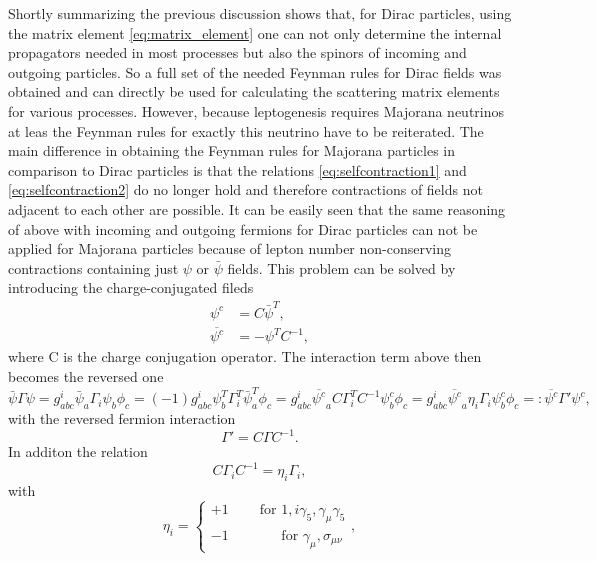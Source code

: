 Shortly summarizing the previous discussion shows that, for Dirac particles, using the matrix element \eqref{eq:matrix_element} one can not only determine the internal propagators needed in most processes but also the spinors of incoming and outgoing particles. So a full set of the needed Feynman rules for Dirac fields was obtained and can directly be used for calculating the scattering matrix elements for various processes. \newline\indent
However, because leptogenesis requires Majorana neutrinos at leas the Feynman rules for exactly this neutrino have to be reiterated. The main difference in obtaining the Feynman rules for Majorana particles in comparison to Dirac particles is that the relations \eqref{eq:selfcontraction1} and \eqref{eq:selfcontraction2} do no longer hold and therefore contractions of fields not adjacent to each other are possible. It can be easily seen that the same reasoning of above with incoming and outgoing fermions for Dirac particles can not be applied for Majorana particles because of lepton number non-conserving contractions containing just $\psi$ or $\bar{\psi}$ fields.\newline\indent
This problem can be solved by introducing the charge-conjugated fileds 
\begin{align*}
	\psi^c&=C\bar{\psi}^T,\\
	\overline{\psi^c}&=-\psi^T C^{-1},
\end{align*}
where C is the charge conjugation operator. The interaction term above then becomes the reversed one
\begin{equation*}
		\bar{\psi}\Gamma\psi=g^i_{abc}\bar{\psi}_a\Gamma_i\psi_b\phi_c=(-1)g^i_{abc}\psi_b^T\Gamma_i^T\bar{\psi}_a^T\phi_c=g^i_{abc}\overline{\psi^c}_aC\Gamma_i^TC^{-1}\psi^c_b\phi_c=g^i_{abc}\overline{\psi^c}_a\eta_i\Gamma_i\psi^c_b\phi_c=:\overline{\psi^c}\Gamma'\psi^c,
\end{equation*}
with the reversed fermion interaction
\begin{equation*}
	\Gamma'=C\Gamma C^{-1}.
\end{equation*}
In additon the relation
\begin{equation*}
	C\Gamma_i C^{-1}=\eta_i\Gamma_i,
\end{equation*}
with 
\begin{equation*}
	\eta_i=\left\{\begin{array}{c}+1\:\:\:\:\:\:\:\:\:\:\text{for } 1,i\gamma_5,\gamma_\mu\gamma_5\\-1\:\:\:\:\:\:\:\:\:\:\:\:\:\:\:\:\:\text{for }\gamma_\mu,\sigma_{\mu\nu}\end{array}\right.,
\end{equation*}

